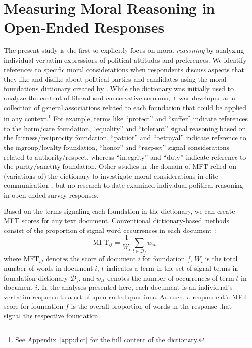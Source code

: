 \documentclass[12pt]{article}
\begin{document}
\section*{Measuring Moral Reasoning in Open-Ended Responses}

The present study is the first to explicitly focus on moral \textit{reasoning} by analyzing individual verbatim expressions of political attitudes and preferences. We identify references to specific moral considerations when respondents discuss aspects that they like and dislike about political parties and candidates using the moral foundations dictionary created by \citet{graham2009liberals}. While the dictionary was initially used to analyze the content of liberal and conservative sermons, it was developed as a collection of general associations related to each foundation that could be applied in any context.\footnote{See Appendix~\ref{app:dict} for the full content of the dictionary.} For example, terms like ``protect'' and ``suffer'' indicate references to the harm/care foundation, ``equality'' and ``tolerant'' signal reasoning based on the fairness/reciprocity foundation, ``patriot'' and ``betrayal'' indicate reference to the ingroup/loyalty foundation, ``honor'' and ``respect'' signal considerations related to authority/respect, whereas ``integrity'' and ``duty'' indicate reference to the purity/sanctity foundation. Other studies in the domain of MFT relied on (variations of) the dictionary to investigate moral considerations in elite communication \citep[e.g. in news media coverage about stem cell research,][]{clifford2013words}, but no research to date examined individual political reasoning in open-ended survey responses.

Based on the terms signaling each foundation in the dictionary, we can create MFT scores for any text document. Conventional dictionary-based methods consist of the proportion of signal word occurrences in each document \citep[e.g.][]{graham2009liberals}:
\begin{equation}\label{eq:tfidf}
\text{MFT}_{if} = \dfrac{1}{W_i} \sum_{t \in \mathcal{D}_f} w_{it},
\end{equation}
where $\text{MFT}_{if}$ denotes the score of document $i$ for foundation $f$, $W_i$ is the total number of words in document $i$, $t$ indicates a term in the set of signal terms in foundation dictionary $\mathcal{D}_f$, and $w_{it}$ denotes the number of occurrences of term $t$ in document $i$. In the analyses presented here, each document is an individual's verbatim response to a set of open-ended questions. As such, a respondent's MFT score for foundation $f$ is the overall proportion of words in the response that signal the respective foundation.
\end{document}
